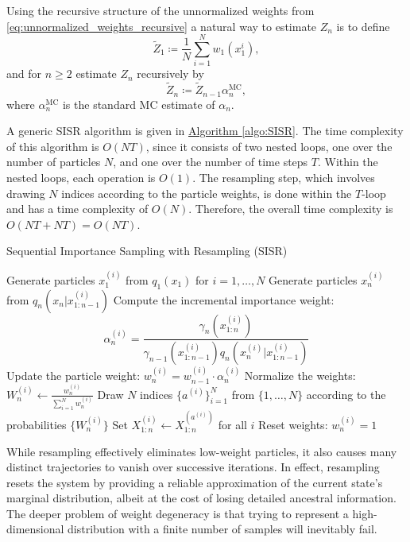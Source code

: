 Using the recursive structure of the unnormalized weights from \cref{eq:unnormalized_weights_recursive} a natural way to estimate 
$Z_n$ is to define 
\[
\widetilde{Z}_1\coloneq \frac{1}{N}\sum_{i=1}^N w_1(x_1^{i}),
\]
and for $n\geq 2$ estimate $Z_n$ recursively by 
\begin{equation}
	\widetilde{Z}_n \coloneq\widetilde{Z}_{n-1}{\alpha}_n^{\text{MC}}, \label{eq:est_Z_SIS}
\end{equation}
where ${\alpha}_n^{\text{MC}}$ is the standard MC estimate of $\alpha_n$. 

A generic \gls*{SISR} algorithm is given in \hyperref[algo:SISR]{Algorithm \ref*{algo:SISR}}. The time complexity of this algorithm is \(O(NT)\), since it consists of two nested loops, one over the number of particles \(N\), and one over the number of time steps \(T\). Within the nested loops, each operation is \(O(1)\). The resampling step, which involves drawing \(N\) indices according to the particle weights, is done within the \(T\)-loop and has a time complexity of \(O(N)\). Therefore, the overall time complexity is \(O(NT + NT) = O(NT)\).

\begin{algorithm}[H]
	\caption{Sequential Importance Sampling with Resampling (SISR)}
	\label{algo:SISR}
	\begin{algorithmic}[1]
		\State Generate particles \(x_1^{(i)}\) from \( q_1(x_1)\) for \( i = 1, \dots, N \)
		\State Generate particles \(x_n^{(i)}\) from \(q_n(x_n\vert x_{1:n-1}^{(i)})\) 
		\State Compute the incremental importance weight: 
		\[
		\alpha_n^{(i)} = \frac{\gamma_n(x_{1:n}^{(i)})}{\gamma_{n-1}(x_{1:n-1}^{(i)}) q_n(x_n^{(i)} \vert x_{1:n-1}^{(i)})} 
		\] 
		\State Update the particle weight: \( w_n^{(i)} = w_{n-1}^{(i)} \cdot \alpha_n^{(i)} \)
		\EndFor
		\State Normalize the weights: \(W_n^{(i)} \leftarrow \frac{w_n^{(i)}}{\sum_{i=1}^N w_n^{(i)}} \)
		\State Draw \(N\) indices \(\{a^{(i)}\}_{i=1}^N\) from \(\{1,\dots,N\}\) according to the probabilities \(\{W_n^{(i)}\}\)
		\State Set \( X_{1:n}^{(i)} \leftarrow X_{1:n}^{(a^{(i)})} \) for all \( i \)
		\State Reset weights: $w_n^{(i)}=1$
		\EndFor
	\end{algorithmic}
\end{algorithm}
While resampling effectively eliminates low-weight particles, it also causes many distinct trajectories to vanish over successive iterations. In effect, resampling resets the system by providing a reliable approximation of the current state's marginal distribution, albeit at the cost of losing detailed ancestral information. The deeper problem of weight degeneracy is that trying to represent a high-dimensional distribution with a finite number of samples will inevitably fail. 

